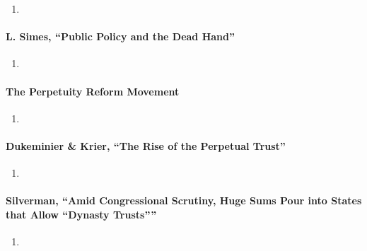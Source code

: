 \begin{enumerate}
    \item %
\end{enumerate}

\paragraph{L. Simes, ``Public Policy and the Dead Hand''}

\begin{enumerate}
    \item %
\end{enumerate}

\paragraph{The Perpetuity Reform Movement}

\begin{enumerate}
    \item %
\end{enumerate}

\paragraph{Dukeminier \& Krier, ``The Rise of the Perpetual Trust''}

\begin{enumerate}
    \item %
\end{enumerate}

\paragraph{Silverman, ``Amid Congressional Scrutiny, Huge Sums Pour into 
States that Allow \enquote{Dynasty Trusts}''}

\begin{enumerate}
    \item %
\end{enumerate}

